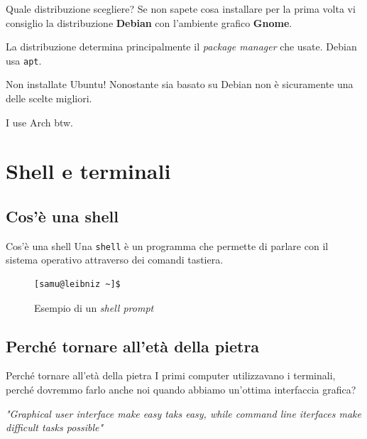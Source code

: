 \documentclass{beamer}
\begin{document}
\begin{frame}{Quale distribuzione scegliere?}
  Se non sapete cosa installare per la prima volta vi consiglio la distribuzione
  \textbf{Debian} con l'ambiente grafico \textbf{Gnome}.\bigskip

  La distribuzione determina principalmente il \textit{package manager} che 
  usate. Debian usa \texttt{apt}.\bigskip

  Non installate Ubuntu! Nonostante sia basato su Debian non è sicuramente una
  delle scelte migliori.\bigskip

  I use Arch btw.
\end{frame}

\section{Shell e terminali}

\subsection{Cos'è una shell}
\begin{frame}[fragile]{Cos'è una shell}
  Una \texttt{shell} è un programma che permette di parlare con il sistema 
  operativo attraverso dei comandi tastiera.
  \pause

  \begin{figure}
        \begin{lstlisting}
[samu@leibniz ~]$
    \end{lstlisting}
    \caption{Esempio di un \textit{shell prompt}}
  \end{figure}
\end{frame}

\subsection{Perché tornare all'età della pietra}
\begin{frame}{Perché tornare all'età della pietra}
  I primi computer utilizzavano i terminali, perché dovremmo farlo anche noi
  quando abbiamo un'ottima interfaccia grafica?\bigskip
  \pause

  \textit{"Graphical user interface make easy taks easy, while command line 
  iterfaces make difficult tasks possible"}
\end{frame}
\end{document}
